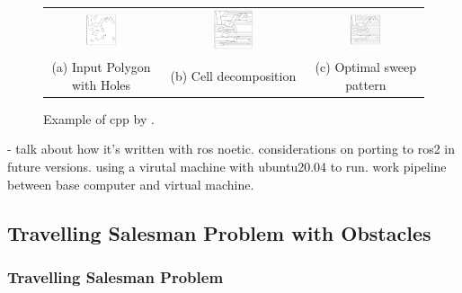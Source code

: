 \begin{figure}[h]
    \centering
    \begin{tabular}{ccc}
        \includegraphics[width=0.3\textwidth]{figs/Jihwan/bahnemann1.png} &
        \includegraphics[width=0.3\textwidth]{figs/Jihwan/bahnemann2.png} &
        \includegraphics[width=0.3\textwidth]{figs/Jihwan/bahnemann3.png} \\
        (a) Input Polygon with Holes & (b) Cell decomposition & (c) Optimal sweep pattern
    \end{tabular}
    \caption[Example of \gls{cpp} by \cite{bahnemann2021cpp}]
    {Example of \gls{cpp} by \cite{bahnemann2021cpp}.}
    \label{fig:msp_bahnemann}
\end{figure}

- talk about how it's written with ros noetic. considerations on porting to ros2 in future versions. using a virutal machine with ubuntu20.04 to run. work pipeline between base computer and virtual machine. 

\subsection{Travelling Salesman Problem with Obstacles}
\label{sec:msp_tspo}

\subsubsection{Travelling Salesman Problem}

